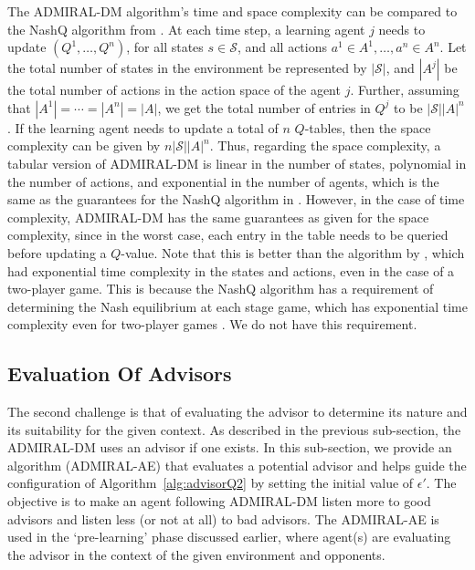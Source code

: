 \documentclass[jair, twoside,11pt,theapa]{article}
\begin{document}



The ADMIRAL-DM algorithm's time and space complexity can be compared to the NashQ algorithm from \citet{hu2003nash}. At each time step, a learning agent $j$ needs to update $(Q^1, \ldots, Q^n)$, for all states $s \in \mathcal{S}$, and all actions $a^1 \in A^1, \ldots, a^n \in A^n$. Let the total number of states in the environment be represented by $|\mathcal{S}|$, and $|A^j|$ be the total number of actions in the action space of the agent $j$. Further, assuming that $|A^1| = \cdots = | A^n| = |A|$, we get the total number of entries in $Q^j$ to be $|\mathcal{S}||A|^n$. If the learning agent needs to update a total of $n$ $Q$-tables, then the space complexity can be given by $n|\mathcal{S}||A|^n$.  Thus, regarding the space complexity, a tabular version of ADMIRAL-DM is linear in the number of states, polynomial in the number of actions, and exponential in the number of agents, which is the same as the guarantees for the NashQ algorithm in \citet{hu2003nash}. However, in the case of time complexity, ADMIRAL-DM has the same guarantees as given for the space complexity, since in the worst case, each entry in the table needs to be queried before updating a $Q$-value. Note that this is better than the algorithm by \citet{hu2003nash}, which had exponential time complexity in the states and actions, even in the case of a two-player game. This is because the NashQ algorithm has a requirement of determining the Nash equilibrium at each stage game, which has exponential time complexity even for two-player games \citep{neumann1928theorie}. We do not have this requirement.





\subsection{Evaluation Of Advisors}\label{sec:offpolicy}

The second challenge is that of evaluating the advisor to determine its nature and its suitability for the given context. As described in the previous sub-section, the ADMIRAL-DM uses an advisor if one exists. In this sub-section, we provide an algorithm (ADMIRAL-AE) that evaluates a potential advisor and helps guide the configuration of Algorithm~\ref{alg:advisorQ2} by setting the initial value of $\epsilon'$. The objective is to make an agent following ADMIRAL-DM listen more to good advisors and listen less (or not at all) to bad advisors. The ADMIRAL-AE is used in the `pre-learning' phase discussed earlier, where agent(s) are evaluating the advisor in the context of the given environment and opponents.    
\end{document}
